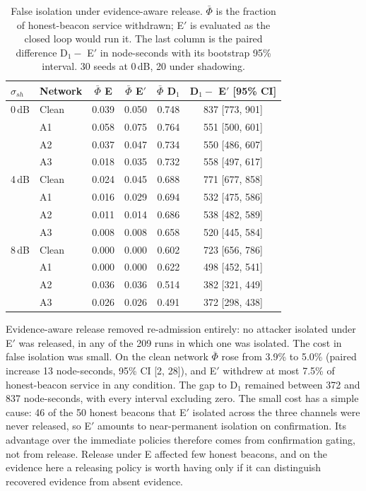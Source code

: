 \documentclass[pdflatex,sn-mathphys-num]{sn-jnl}%
\theoremstyle{thmstyleone}%
\theoremstyle{thmstyletwo}%
\theoremstyle{thmstylethree}%
\begin{document}
\begin{table}[!t]
\caption{False isolation under evidence-aware release. $\bar\Phi$ is the
fraction of honest-beacon service withdrawn; E$'$ is evaluated as the closed
loop would run it. The last column is the paired difference D$_1 -$ E$'$ in
node-seconds with its bootstrap 95\% interval. 30 seeds at 0\,dB, 20 under
shadowing.}
\label{tab:release}
\centering
\footnotesize
\setlength{\tabcolsep}{4pt}
\begin{tabular}{@{}llcccc@{}}
\toprule
$\sigma_{sh}$ & Network & $\bar\Phi$ E & $\bar\Phi$ E$'$ & $\bar\Phi$ D$_1$ & D$_1 -$ E$'$ [95\% CI] \\
\midrule
0\,dB & Clean & 0.039 & 0.050 & 0.748 & 837 [773, 901] \\
      & A1    & 0.058 & 0.075 & 0.764 & 551 [500, 601] \\
      & A2    & 0.037 & 0.047 & 0.734 & 550 [486, 607] \\
      & A3    & 0.018 & 0.035 & 0.732 & 558 [497, 617] \\
4\,dB & Clean & 0.024 & 0.045 & 0.688 & 771 [677, 858] \\
      & A1    & 0.016 & 0.029 & 0.694 & 532 [475, 586] \\
      & A2    & 0.011 & 0.014 & 0.686 & 538 [482, 589] \\
      & A3    & 0.008 & 0.008 & 0.658 & 520 [445, 584] \\
8\,dB & Clean & 0.000 & 0.000 & 0.602 & 723 [656, 786] \\
      & A1    & 0.000 & 0.000 & 0.622 & 498 [452, 541] \\
      & A2    & 0.036 & 0.036 & 0.514 & 382 [321, 449] \\
      & A3    & 0.026 & 0.026 & 0.491 & 372 [298, 438] \\
\bottomrule
\end{tabular}
\end{table}

Evidence-aware release removed re-admission entirely: no attacker isolated
under E$'$ was released, in any of the 209 runs in which one was isolated. The
cost in false isolation was small. On the clean network $\bar\Phi$ rose from
3.9\% to 5.0\% (paired increase 13 node-seconds, 95\% CI [2, 28]), and E$'$
withdrew at most 7.5\% of honest-beacon service in any condition. The gap to
D$_1$ remained between 372 and 837 node-seconds, with every interval
excluding zero. The small cost has a simple cause: 46 of the 50 honest
beacons that E$'$ isolated across the three channels were never released, so
E$'$ amounts to near-permanent isolation on confirmation. Its advantage over
the immediate policies therefore comes from confirmation gating, not from
release. Release under E affected few honest beacons, and on the evidence
here a releasing policy is worth having only if it can distinguish recovered
evidence from absent evidence.
\end{document}
